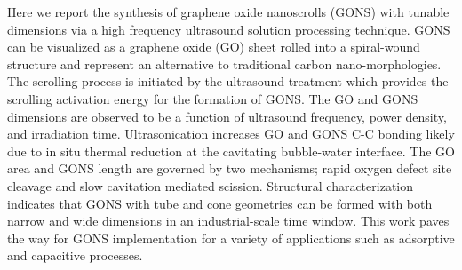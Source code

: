 \justifying
Here we report the synthesis of graphene oxide nanoscrolls (GONS) with tunable dimensions via a high frequency ultrasound solution processing technique. GONS can be visualized as a graphene oxide (GO) sheet rolled into a spiral-wound structure and represent an alternative to traditional carbon nano-morphologies. The scrolling process is initiated by the ultrasound treatment which provides the scrolling activation energy for the formation of GONS. The GO and GONS dimensions are observed to be a function of ultrasound frequency, power density, and irradiation time. Ultrasonication increases GO and GONS C-C bonding likely due to in situ thermal reduction at the cavitating bubble-water interface. The GO area and GONS length are governed by two mechanisms; rapid oxygen defect site cleavage and slow cavitation mediated scission. Structural characterization indicates that GONS with tube and cone geometries can be formed with both narrow and wide dimensions in an industrial-scale time window. This work paves the way for GONS implementation for a variety of applications such as adsorptive and capacitive processes.